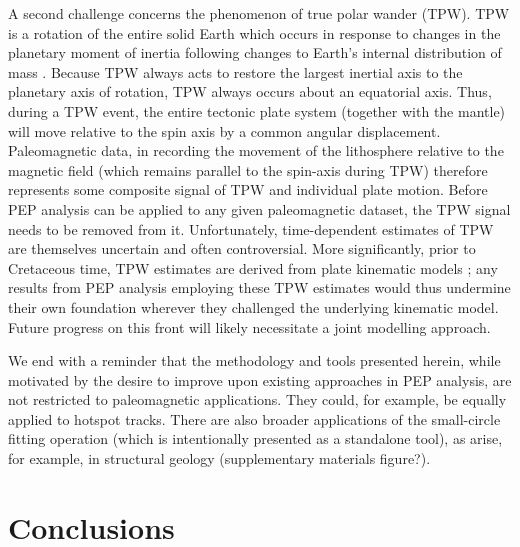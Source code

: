 \documentclass{article} %
\begin{document}
A second challenge concerns the phenomenon of true polar wander (TPW). TPW is a rotation of the entire solid Earth which occurs in response to changes in the planetary moment of inertia following changes to Earth's internal distribution of mass \citep{goldreich1969some}. Because TPW always acts to restore the largest inertial axis to the planetary axis of rotation, TPW always occurs about an equatorial axis. Thus, during a TPW event, the entire tectonic plate system (together with the mantle) will move relative to the spin axis by a common angular displacement. Paleomagnetic data, in recording the movement of the lithosphere relative to the magnetic field (which remains parallel to the spin-axis during TPW) therefore represents some composite signal of TPW and individual plate motion. Before PEP analysis can be applied to any given paleomagnetic dataset, the TPW signal needs to be removed from it. Unfortunately, time-dependent estimates of TPW are themselves uncertain and often controversial. More significantly, prior to Cretaceous time, TPW estimates are derived from plate kinematic models \citep{steinberger2008absolute}; any results from PEP analysis employing these TPW estimates would thus undermine their own foundation wherever they challenged the underlying kinematic model. Future progress on this front will likely necessitate a joint modelling approach.  

We end with a reminder that the methodology and tools presented herein, while motivated by the desire to improve upon existing approaches in PEP analysis, are not restricted to paleomagnetic applications. They could, for example, be equally applied to hotspot tracks. There are also broader applications of the small-circle fitting operation (which is intentionally presented as a standalone tool), as arise, for example, in structural geology (supplementary materials figure?).

\section{Conclusions}
\end{document}

